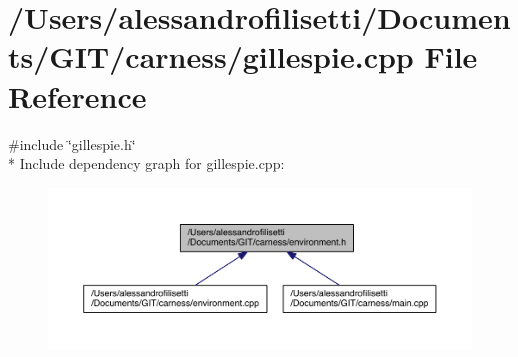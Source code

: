 \hypertarget{a00065}{\section{/\-Users/alessandrofilisetti/\-Documents/\-G\-I\-T/carness/gillespie.cpp File Reference}
\label{a00065}
}
{\ttfamily \#include \char`\"{}gillespie.\-h\char`\"{}}\\*
Include dependency graph for gillespie.\-cpp\-:
\nopagebreak
\begin{figure}[H]
\begin{center}
\leavevmode
\includegraphics[width=350pt]{a00183}
\end{center}
\end{figure}
